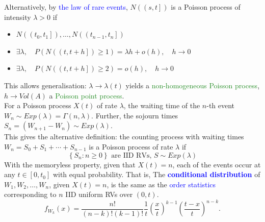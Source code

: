 Alternatively, by \textcolor{Blue}{the law of rare events}, $N\left( \left(
\left. s,t \right] \right. \right) $ is a \textcolor{Bittersweet}{Poisson
process} of intensity $\lambda>0$ if
\begin{itemize}
  \item $N\left( \left( \left. t_0,t_1 \right] \right. \right),\ldots,N\left(
    \left( \left. t_{n-1}, t_{n} \right] \right. \right)$
  \item $\exists \lambda,\quad P\left( N\left( \left( \left. t,t+h \right]
    \right.  \right) \ge 1 \right)=\lambda h+o(h),\quad h\to 0$
  \item $\exists \lambda,\quad P\left( N\left( \left( \left. t,t+h \right]
    \right.  \right) \ge 2 \right)=o(h),\quad h\to 0$
\end{itemize}
This allows generalisation: $\lambda\to\lambda(t)$ yields a
\textcolor{ForestGreen}{non-homogeneous Poisson process}, $h\to Vol(A)$ a
\textcolor{ForestGreen}{Poisson point process}.\\
For a Poisson process $X(t)$ of rate $\lambda$, the
\textcolor{Bittersweet}{waiting time} of the $n$-th event $W_{n}\sim
Exp(\lambda)=\Gamma(n,\lambda)$. Further, the
\textcolor{Bittersweet}{sojourn times} $S_{n}=(W_{n+1}-W_{n})\sim
Exp(\lambda)$.\\
This gives the alternative definition: the counting process with waiting times
$W_{n}=S_0+S_1+\cdots+S_{n-1}$ is a \textcolor{Bittersweet}{Poisson process} of
rate $\lambda$ if
\[\left\{ S_{n}:n\ge 0 \right\} \text{ are IID RVs, } S\sim Exp(\lambda)\]
With the memoryless property, given that $X(t)=n$, each of the events occur at
any $t\in \left[ 0,t_0 \right]$ with equal probability. That is, The
\textbf{\textcolor{Blue}{conditional distribution}} of $W_1,W_2,\ldots,W_{n}$,
given $X(t)=n$, is the same as the \textcolor{Blue}{order statistics} corresponding
to $n$ IID uniform RVs over $\left( 0,t \right) $.
\vspace{-1mm}
\[f_{W_k}(x)=\frac{n\mathpunct{!}}{(n-k)\mathpunct{!}(k-1)\mathpunct{!}}\frac{1}{t}{\left( \frac{x}{t} \right)}^{k-1}{\left( \frac{t-x}{t} \right)}^{n-k}.\] 

